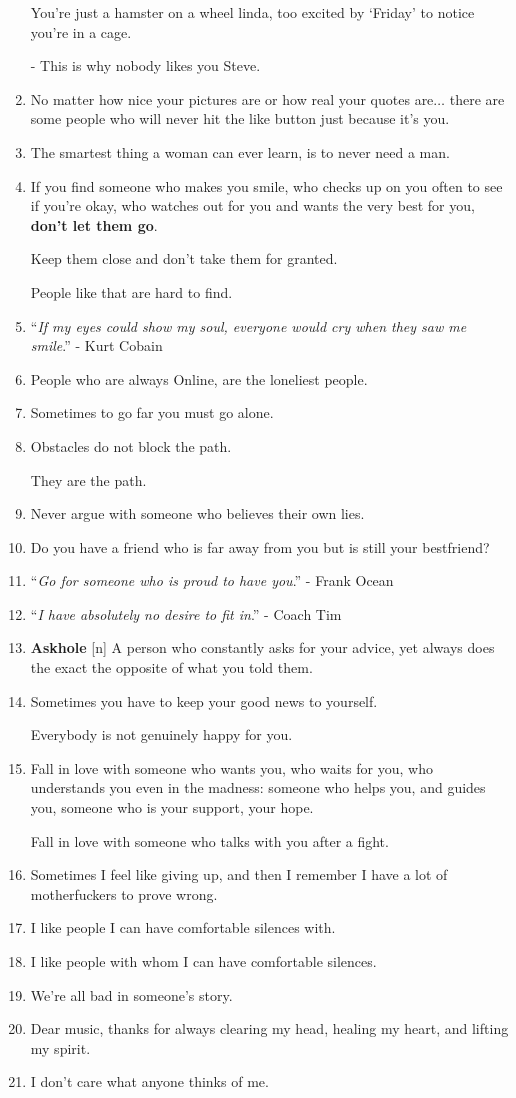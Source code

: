 \documentclass{article}
\begin{document}
\begin{enumerate}
	You're just a hamster on a wheel linda, too excited by `Friday' to notice you're in a cage.
	
	- This is why nobody likes you Steve.
	\item No matter how nice your pictures are or how real your quotes are$\ldots$ there are some people who will never hit the like button just because it's you.
	\item The smartest thing a woman can ever learn, is to never need a man.
	\item If you find someone who makes you smile, who checks up on you often to see if you're okay, who watches out for you and wants the very best for you, \textbf{don't let them go}.
	
	Keep them close and don't take them for granted.
	
	People like that are hard to find.
	\item ``\textit{If my eyes could show my soul, everyone would cry when they saw me smile}.'' - Kurt Cobain
	\item People who are always Online, are the loneliest people.
	\item Sometimes to go far you must go alone.
	\item Obstacles do not block the path.
	
	They are the path.
	\item Never argue with someone who believes their own lies.
	\item Do you have a friend who is far away from you but is still your bestfriend?
	\item ``\textit{Go for someone who is proud to have you}.'' - Frank Ocean
	\item ``\textit{I have absolutely no desire to fit in}.'' - Coach Tim
	\item \textbf{Askhole} [n] A person who constantly asks for your advice, yet always does the exact the opposite of what you told them.
	\item Sometimes you have to keep your good news to yourself.
	
	Everybody is not genuinely happy for you.
	\item Fall in love with someone who wants you, who waits for you, who understands you even in the madness: someone who helps you, and guides you, someone who is your support, your hope.
	
	Fall in love with someone who talks with you after a fight.
	\item Sometimes I feel like giving up, and then I remember I have a lot of motherfuckers to prove wrong.
	\item I like people I can have comfortable silences with.
	\item I like people with whom I can have comfortable silences.
	\item We're all bad in someone's story.
	\item Dear music, thanks for always clearing my head, healing my heart, and lifting my spirit.
	\item I don't care what anyone thinks of me.
	

\end{enumerate}
\end{document}
